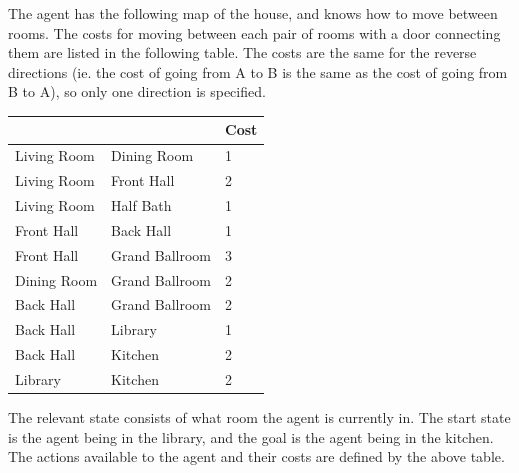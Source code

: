 \documentclass[12pt]{article}
\newcommand{\n}{\vspace{5mm}}
\begin{document}
The agent has the following map of the house, and knows how to move between
rooms. The costs for moving between each pair of rooms with a door connecting
them are listed in the following table.  The costs are the same for the reverse
directions (ie. the cost of going from A to B is the same as the cost of going
from B to A), so only one direction is specified.

\n
\begin{tabular}{|l|l|l|}
  \hline
  & & Cost \\
  \hline
  Living Room & Dining Room & 1 \\
  \hline
  Living Room & Front Hall & 2 \\
  \hline
  Living Room & Half Bath & 1 \\
  \hline
  Front Hall & Back Hall & 1 \\
  \hline
  Front Hall & Grand Ballroom & 3 \\
  \hline
  Dining Room & Grand Ballroom & 2 \\
  \hline
  Back Hall & Grand Ballroom & 2 \\
  \hline
  Back Hall & Library & 1 \\
  \hline
  Back Hall & Kitchen & 2 \\
  \hline
  Library & Kitchen & 2 \\
  \hline
\end{tabular}
\n

The relevant state consists of what room the agent is currently in.  The start
state is the agent being in the library, and the goal is the agent being in the
kitchen.  The actions available to the agent and their costs are defined by the
above table.
\end{document}
